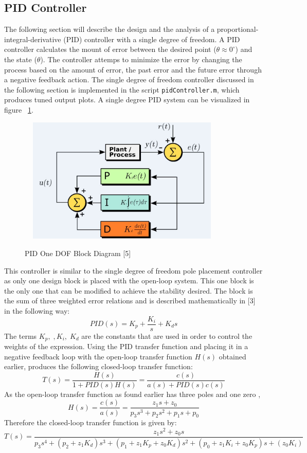 \documentclass[12pt]{article} %
\begin{document}
\subsection{PID Controller}
The following section will describe the design and the analysis of a proportional-integral-derivative (PID) controller with a single degree of freedom. A PID controller calculates the mount of error between the desired point ($\theta \approx 0^{\circ}$) and the state ($\theta$). The controller attemps to minimize the error by changing the process based on the amount of error, the past error and the future error through a negative feedback action. The single degree of freedom controller discussed in the following section is implemented in the script \texttt{pidController.m}, which produces tuned output plots. A single degree PID system can be visualized in figure ~\ref{fig:PID_oneDOF}. 
\begin{figure}[h] 
\caption{PID One DOF Block Diagram [5]}
\includegraphics[height=6cm, width = 10cm]{./images/PID_oneDOF.jpg}
\label{fig:PID_oneDOF}
\centering
\end{figure}
This controller is similar to the single degree of freedom pole placement controller as only one design block is placed with the open-loop system. This one block is the only one that can be modified to achieve the stability desired. The block is the sum of three weighted error relations and is described mathematically in [3] in the following way: 
\begin{equation}
PID(s) = K_p + \frac{K_i}{s} + K_d s
\end{equation}
The terms $K_p, \;, K_i, \;K_d$ are the constants that are used in order to control the weights of the expression. Using the PID transfer function and placing it in a negative feedback loop with the open-loop transfer function $H(s)$ obtained earlier, produces the following closed-loop transfer function:
\begin{equation}
T(s) = \frac{H(s)}{1 + PID(s) H(s)} = \frac{c(s)}{a(s) + PID(s)c(s)}
\end{equation}
As the open-loop transfer function as found earlier has three poles and one zero , 
\begin{equation}
 H(s) = \frac{c(s)}{a(s)} = \frac{z_1s + z_0}{p_3s^3 + p_2s^2 + p_1s + p_0}
\end{equation}
Therefore the closed-loop transfer function is given by:
\begin{equation}
T(s) = \frac{z_1s^2 + z_0s}{p_3s^4 + (p_2+z_1K_d)s^3 + (p_1+z_1K_p+z_0K_d)s^2 + (p_0+z_1K_i+z_0K_p)s + (z_0K_i)}
\end{equation}
\end{document}
